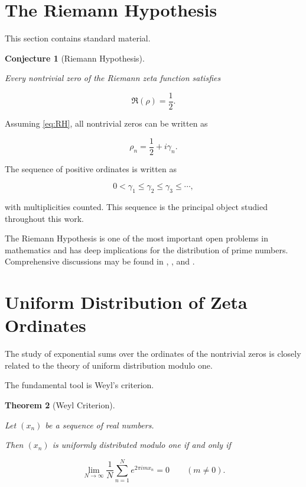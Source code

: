 \documentclass[11pt]{amsart}
\numberwithin{equation}{section}
\theoremstyle{plain}
\newtheorem{theorem}{Theorem}[section]
\newtheorem{conjecture}[theorem]{Conjecture}
\theoremstyle{definition}
\theoremstyle{remark}
\begin{document}
\section{The Riemann Hypothesis}
\label{sec:riemann_hypothesis}

This section contains standard material.

\begin{conjecture}[Riemann Hypothesis]
\label{conj:RH}

Every nontrivial zero of the Riemann zeta function satisfies

\begin{equation}
\Re(\rho)
=
\frac12.
\label{eq:RH}
\end{equation}

\end{conjecture}

Assuming
\eqref{eq:RH},
all nontrivial zeros can be written as

\begin{equation}
\rho_n
=
\frac12
+
i\gamma_n.
\label{eq:RH_zeros}
\end{equation}

The sequence of positive ordinates is written as

\begin{equation}
0<\gamma_1
\leq
\gamma_2
\leq
\gamma_3
\leq
\cdots,
\label{eq:gamma_ordering}
\end{equation}

with multiplicities counted. This sequence is the principal object
studied throughout this work.

The Riemann Hypothesis is one of the most important open problems in
mathematics and has deep implications for the distribution of prime
numbers.
Comprehensive discussions may be found in
\cite{Titchmarsh1986},
\cite{Edwards2001},
and
\cite{IwaniecKowalski2004}.

\section{Uniform Distribution of Zeta Ordinates}
\label{sec:uniform_distribution_zeta_ordinates}

The study of exponential sums over the ordinates of the nontrivial
zeros is closely related to the theory of uniform distribution modulo
one.

The fundamental tool is Weyl's criterion.

\begin{theorem}[Weyl Criterion]
\label{thm:weyl_criterion}

Let $(x_n)$ be a sequence of real numbers.

Then $(x_n)$ is uniformly distributed modulo one if and only if

\begin{equation}
\lim_{N\to\infty}
\frac{1}{N}
\sum_{n=1}^{N}
e^{2\pi i m x_n}
=
0
\qquad
(m\neq 0).
\label{eq:weyl_criterion}
\end{equation}

\end{theorem}
\end{document}
